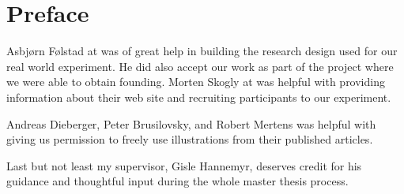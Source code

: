 \chapter{Preface}

Asbj\o{}rn F\o{}lstad at  was of great help in building the
research design used for our real world experiment.
He did also accept our work as part of the  project where we
were able to obtain founding.
Morten Skogly at  \urort{} was helpful with providing information
about their web site and recruiting participants to our experiment.

Andreas Dieberger, Peter Brusilovsky, and Robert Mertens was helpful with
giving us permission to freely use illustrations from their
published articles.

Last but not least my supervisor, Gisle Hannemyr, deserves credit for
his guidance and thoughtful input during the whole master thesis process.
